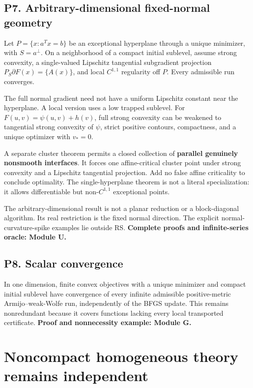 \subsection{P7. Arbitrary-dimensional fixed-normal geometry}\label{p7.-arbitrary-dimensional-fixed-normal-geometry}

Let \(P=\{x:a^Tx=b\}\) be an exceptional hyperplane through a unique minimizer, with \(S=a^\perp\). On a neighborhood of a compact initial sublevel, assume strong convexity, a single-valued Lipschitz tangential subgradient projection \(P_S\partial F(x)=\{A(x)\}\), and local \(C^{1,1}\) regularity off \(P\). Every admissible run converges.

The full normal gradient need not have a uniform Lipschitz constant near the hyperplane. A local version uses a low trapped sublevel. For \(F(u,v)=\psi(u,v)+h(v)\), full strong convexity can be weakened to tangential strong convexity of \(\psi\), strict positive contours, compactness, and a unique optimizer with \(v_*=0\).

A separate cluster theorem permits a closed collection of \textbf{parallel genuinely nonsmooth interfaces}. It forces one affine-critical cluster point under strong convexity and a Lipschitz tangential projection. Add no false affine criticality to conclude optimality. The single-hyperplane theorem is not a literal specialization: it allows differentiable but non-\(C^{1,1}\) exceptional points.

The arbitrary-dimensional result is not a planar reduction or a block-diagonal algorithm. Its real restriction is the fixed normal direction. The explicit normal-curvature-spike examples lie outside RS. \textbf{Complete proofs and infinite-series oracle: Module U.}

\subsection{P8. Scalar convergence}\label{p8.-scalar-convergence}

In one dimension, finite convex objectives with a unique minimizer and compact initial sublevel have convergence of every infinite admissible positive-metric Armijo--weak-Wolfe run, independently of the BFGS update. This remains nonredundant because it covers functions lacking every local transported certificate. \textbf{Proof and nonnecessity example: Module G.}

\section{Noncompact homogeneous theory remains independent}\label{noncompact-homogeneous-theory-remains-independent}

